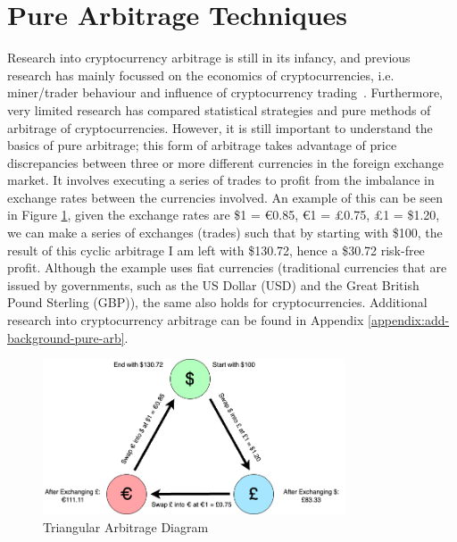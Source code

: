 \section{Pure Arbitrage Techniques}
\label{sec:pure-arb}
Research into cryptocurrency arbitrage is still in its infancy, and previous research has mainly focussed on the economics of cryptocurrencies, i.e. miner/trader behaviour and influence of cryptocurrency trading~\cite{eyal2015miner, avarikioti2020ride, huberman2021monopoly, athey2016bitcoin, easley2019mining, harvey2016cryptofinance, pagnotta2018equilibrium}. Furthermore, very limited research has compared statistical strategies and pure methods of arbitrage of cryptocurrencies. However, it is still important to understand the basics of pure arbitrage; this form of arbitrage takes advantage of price discrepancies between three or more different currencies in the foreign exchange market. It involves executing a series of trades to profit from the imbalance in exchange rates between the currencies involved. An example of this can be seen in Figure \ref{fig:tri-arb}, given the exchange rates are \$1 = \euro 0.85, \euro 1 = \pounds0.75, \pounds1 = \$1.20, we can make a series of exchanges (trades) such that by starting with \$100, the result of this cyclic arbitrage I am left with \$130.72, hence a \$30.72 risk-free profit. Although the example uses fiat currencies (traditional currencies that are issued by governments, such as the US Dollar (USD) and the Great British Pound Sterling (GBP)), the same also holds for cryptocurrencies. Additional research into cryptocurrency arbitrage can be found in Appendix \ref{appendix:add-background-pure-arb}.

\begin{figure}[!htb]
    \centering
    \includegraphics[width=0.8\textwidth]{background/Images/arbitrage_diagram.png}
    \caption{Triangular Arbitrage Diagram\label{fig:tri-arb}}
\end{figure}

